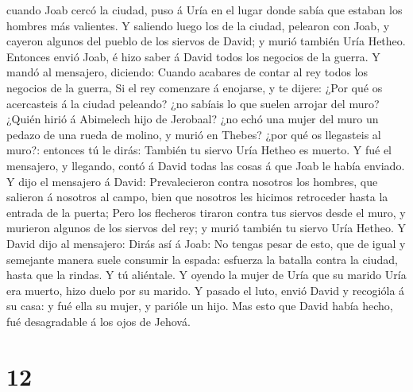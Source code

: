 cuando Joab cercó la ciudad, puso á Uría en el lugar donde sabía que
estaban los hombres más valientes.  Y saliendo luego los de
la ciudad, pelearon con Joab, y cayeron algunos del pueblo de los
siervos de David; y murió también Uría Hetheo.  Entonces
envió Joab, é hizo saber á David todos los negocios de la guerra.
 Y mandó al mensajero, diciendo: Cuando acabares de contar
al rey todos los negocios de la guerra,  Si el rey
comenzare á enojarse, y te dijere: ¿Por qué os acercasteis á la ciudad
peleando? ¿no sabíais lo que suelen arrojar del muro? 
¿Quién hirió á Abimelech hijo de Jerobaal? ¿no echó una mujer del muro
un pedazo de una rueda de molino, y murió en Thebes? ¿por qué os
llegasteis al muro?: entonces tú le dirás: También tu siervo Uría Hetheo
es muerto.  Y fué el mensajero, y llegando, contó á David
todas las cosas á que Joab le había enviado.  Y dijo el
mensajero á David: Prevalecieron contra nosotros los hombres, que
salieron á nosotros al campo, bien que nosotros les hicimos retroceder
hasta la entrada de la puerta;  Pero los flecheros tiraron
contra tus siervos desde el muro, y murieron algunos de los siervos del
rey; y murió también tu siervo Uría Hetheo.  Y David dijo
al mensajero: Dirás así á Joab: No tengas pesar de esto, que de igual y
semejante manera suele consumir la espada: esfuerza la batalla contra la
ciudad, hasta que la rindas. Y tú aliéntale.  Y oyendo la
mujer de Uría que su marido Uría era muerto, hizo duelo por su marido.
 Y pasado el luto, envió David y recogióla á su casa: y fué
ella su mujer, y parióle un hijo. Mas esto que David había hecho, fué
desagradable á los ojos de Jehová.

\hypertarget{section-11}{%
\section{12}\label{section-11}}

